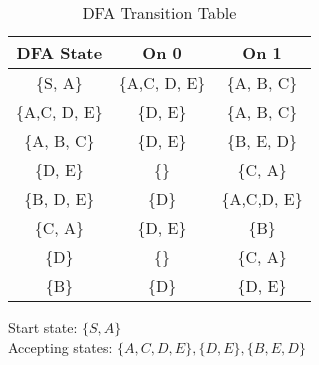\documentclass[8pt]{article}
\begin{document}
\begin{table}[H]
    \centering
    \renewcommand{\arraystretch}{1.3} %
    \begin{tabular}{|c|c|c|}
        \hline
        \rowcolor{gray!20} %
        \textbf{DFA State} & \textbf{On 0} & \textbf{On 1} \\
        \hline
        \{S, A\} & \{A,C, D, E\} & \{A, B, C\} \\
        \hline
        \{A,C, D, E\} & \{D, E\} & \{A, B, C\} \\
        \hline
        \{A, B, C\} & \{D, E\} & \{B, E, D\} \\
        \hline
        \{D, E\} & \{\} & \{C, A\} \\
        \hline
        \{B, D, E\} & \{D\} & \{A,C,D, E\} \\
        \hline
        \{C, A\} & \{D, E\} & \{B\} \\
        \hline
        \{D\} & \{\} & \{C, A\} \\
        \hline
        \{B\} & \{D\} & \{D, E\} \\
        \hline
    \end{tabular}
    \caption{DFA Transition Table}
    \label{tab:dfa_transition}
\end{table}

Start state: $\{S, A\}$ \\
Accepting states: $\{A,C,D, E\}, \{D, E\}, \{B, E, D\}$
\end{document}
